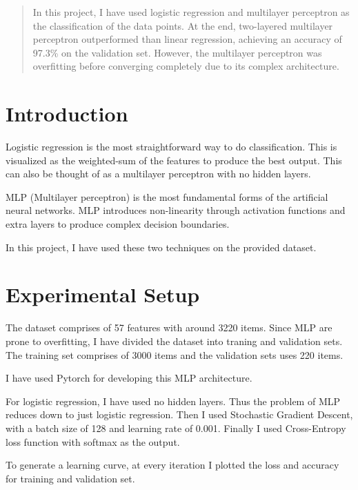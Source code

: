 \documentclass[12pt]{article}
\begin{document}
\maketitle

\begin{abstract}
In this project, I have used logistic regression and multilayer perceptron as the classification of the data points.
At the end, two-layered multilayer perceptron outperformed than linear regression, achieving an accuracy of 97.3\% on the validation set.
However, the multilayer perceptron was overfitting before converging completely due to its complex architecture.
\end{abstract}

\section{Introduction}
Logistic regression is the most straightforward way to do classification.
This is visualized as the weighted-sum of the features to produce the best output.
This can also be thought of as a multilayer perceptron with no hidden layers.

MLP (Multilayer perceptron)  is the most fundamental forms of the artificial neural networks.
MLP introduces non-linearity through activation functions and extra layers to produce complex decision boundaries.

In this project, I have used these two techniques on the provided dataset.

\section{Experimental Setup}
The dataset comprises of 57 features with around 3220 items.
Since MLP are prone to overfitting, I have divided the dataset into traning and validation sets.
The training set comprises of 3000 items and the validation sets uses 220 items.

I have used Pytorch \cite{paszkepytorch} for developing this MLP architecture.

For logistic regression, I have used no hidden layers.
Thus the problem of MLP reduces down to just logistic regression.
Then I used Stochastic Gradient Descent, with a batch size of 128 and learning rate of 0.001.
Finally I used Cross-Entropy loss function with softmax as the output.

To generate a learning curve, at every iteration I plotted the loss and accuracy for training and validation set.
\end{document}
